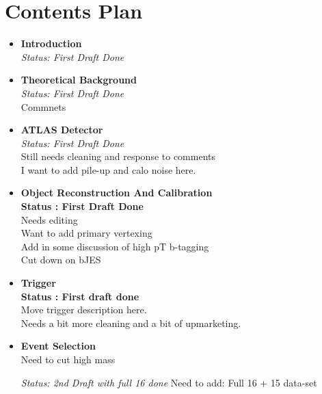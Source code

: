 %
%
%
\chapter{Contents Plan}

\begin{itemize}
\item \textbf{Introduction}\\

\textit{Status: First Draft Done}\\

\item \textbf{Theoretical Background}\\

  \textit{Status: First Draft Done}\\
  Commnets

\item \textbf{ATLAS Detector}\\

\textit{Status: First Draft Done}\\
\noindent
Still needs cleaning and response to comments\\
I want to add pile-up and calo noise here.\\
\noindent

\item \textbf{Object Reconstruction And Calibration}\\

\textbf{Status : First Draft Done}\\
\noindent
Needs editing\\
Want to add primary vertexing\\
Add in some discussion of high pT b-tagging\\
Cut down on bJES

\item \textbf{Trigger}\\

\textbf{Status : First draft done}\\
\noindent
Move trigger description here.\\
Needs a bit more cleaning and a bit of upmarketing.\\

\item \textbf{Event Selection}\\
  Need to cut high mass

\textit{Status: 2nd Draft with full 16 done}
Need to add:
Full 16 + 15 data-set


\end{itemize}
